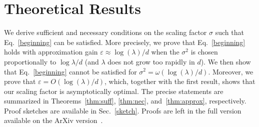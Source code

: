 \section{Theoretical Results}
\label{sec:theory}
We derive sufficient and necessary conditions on the scaling factor $\sigma$ such that Eq.~\eqref{beginning} can be satisfied. More precisely, we prove that 
Eq.~\eqref{beginning} holds with approximation gain $\varepsilon \approx \log(\lambda)/d$ when the  %
$\sigma^2$ is chosen proportionally to $\log \lambda/d$ (and $\lambda$ does not grow too rapidly in $d$). We then show that Eq.~\eqref{beginning} cannot be satisfied for $\sigma^2 = \omega(\log(\lambda)/d)$. Moreover, we prove that $\varepsilon = O(\log(\lambda)/d)$, which, together with the first result, shows that our scaling factor is asymptotically optimal. The precise statements are summarized in Theorems~\ref{thm:suff}, \ref{thm:nec}, and~\ref{thm:approx}, respectively. Proof sketches are available in Sec.~\ref{sketch}. Proofs are left in the full version available on the ArXiv version~\cite{arxivrescaling}.
